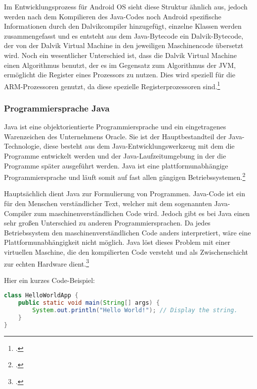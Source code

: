 Im Entwicklungsprozess für Android OS sieht diese Struktur ähnlich aus, jedoch werden nach dem Kompilieren des Java-Codes noch Android spezifische Informationen durch den Dalvikcompiler hinzugefügt, einzelne Klassen werden zusammengefasst und es entsteht aus dem Java-Bytecode ein Dalvik-Bytecode, der von der Dalvik Virtual Machine in den jeweiligen Maschinencode übersetzt wird.
Noch ein wesentlicher Unterschied ist, dass die Dalvik Virtual Machine einen Algorithmus benutzt, der es im Gegensatz zum Algorithmus der JVM, ermöglicht die Register eines Prozessors zu nutzen. Dies wird speziell für die ARM-Prozessoren genutzt, da diese spezielle Registerprozessoren sind.\footcite[vgl.][]{dalvik}



\subsubsection{Programmiersprache Java}
Java ist eine objektorientierte Programmiersprache und ein eingetragenes Warenzeichen des Unternehmens Oracle. Sie ist der Hauptbestandteil der Java-Technologie, diese besteht aus dem Java-Entwicklungswerkzeug mit dem die Programme entwickelt werden und der Java-Laufzeitumgebung in der die Programme später ausgeführt werden. Java ist eine plattformunabhängige  Programmiersprache und läuft somit auf fast allen gängigen Betriebssystemen.\footcite[vgl.][]{java}


Hauptsächlich dient Java zur Formulierung von Programmen. Java-Code ist ein für den Menschen verständlicher Text, welcher mit dem sogenannten Java-Compiler zum maschinenverständlichen Code wird. Jedoch gibt es bei Java einen sehr großen Unterschied zu anderen Programmiersprachen. Da jedes Betriebssystem den maschinenverständlichen Code anders interpretiert, wäre eine Plattformunabhängigkeit nicht möglich. Java löst dieses Problem mit einer virtuellen Maschine, die den kompilierten Code versteht und als Zwischenschicht zur echten Hardware dient.\footcite[vgl.][]{java}

Hier ein kurzes Code-Beispiel:
\begin{lstlisting}[language=java, captionpos=b, caption={Hello World}]
class HelloWorldApp {
    public static void main(String[] args) {
        System.out.println("Hello World!"); // Display the string.
    }
}
\end{lstlisting}


